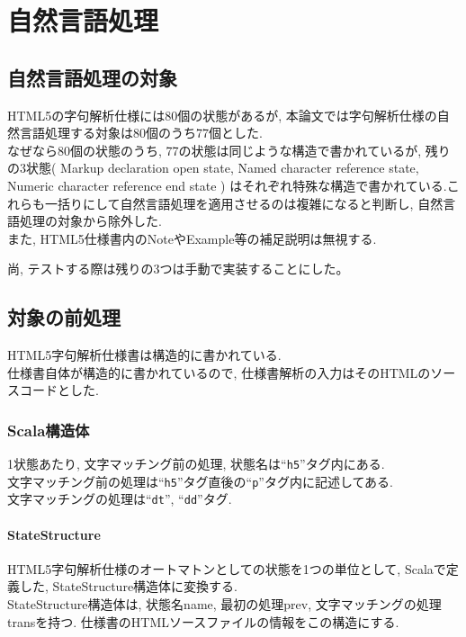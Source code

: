 \documentclass[uplatex,a4j]{jsreport}
\begin{document}
\chapter{自然言語処理}
\label{自然言語処理}
\section{自然言語処理の対象}
HTML5の字句解析仕様には80個の状態があるが, 本論文では字句解析仕様の自然言語処理する対象は80個のうち77個とした.\\
なぜなら80個の状態のうち, 77の状態は同じような構造で書かれているが,
残りの3状態(
Markup declaration open state, 
Named character reference state, 
Numeric character reference end state
)
はそれぞれ特殊な構造で書かれている.これらも一括りにして自然言語処理を適用させるのは複雑になると判断し, 自然言語処理の対象から除外した.
\\
また, HTML5仕様書内のNoteやExample等の補足説明は無視する.

尚, テストする際は残りの3つは手動で実装することにした。

\section{対象の前処理}
HTML5字句解析仕様書は構造的に書かれている. \\
仕様書自体が構造的に書かれているので, 
仕様書解析の入力はそのHTMLのソースコードとした. \\

\subsection{Scala構造体}
1状態あたり, 文字マッチング前の処理, 
状態名は``\texttt{h5}''タグ内にある.\\
文字マッチング前の処理は``\texttt{h5}''タグ直後の``\texttt{p}''タグ内に記述してある.\\
文字マッチングの処理は``\texttt{dt}'', ``\texttt{dd}''タグ.
\subsubsection{StateStructure}
HTML5字句解析仕様のオートマトンとしての状態を1つの単位として, Scalaで定義した, StateStructure構造体に変換する.\\
StateStructure構造体は, 状態名name, 最初の処理prev, 文字マッチングの処理transを持つ.
仕様書のHTMLソースファイルの情報をこの構造にする.
\end{document}
